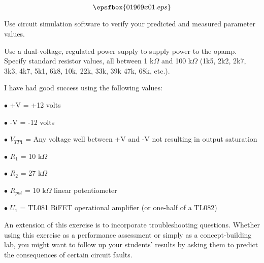 

$$\epsfbox{01969x01.eps}$$

\vfil \eject






Use circuit simulation software to verify your predicted and measured parameter values.







Use a dual-voltage, regulated power supply to supply power to the opamp.  Specify standard resistor values, all between 1 k$\Omega$ and 100 k$\Omega$ (1k5, 2k2, 2k7, 3k3, 4k7, 5k1, 6k8, 10k, 22k, 33k, 39k 47k, 68k, etc.).

I have had good success using the following values:

\medskip
\item{$\bullet$} +V = +12 volts
\item{$\bullet$} -V = -12 volts
\item{$\bullet$} $V_{TP1}$ = Any voltage well between +V and -V not resulting in output saturation
\item{$\bullet$} $R_1$ = 10 k$\Omega$
\item{$\bullet$} $R_2$ = 27 k$\Omega$
\item{$\bullet$} $R_{pot}$ = 10 k$\Omega$ linear potentiometer
\item{$\bullet$} $U_1$ = TL081 BiFET operational amplifier (or one-half of a TL082)
\medskip

An extension of this exercise is to incorporate troubleshooting questions.  Whether using this exercise as a performance assessment or simply as a concept-building lab, you might want to follow up your students' results by asking them to predict the consequences of certain circuit faults.




